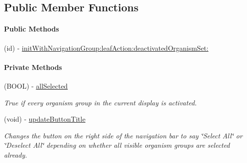 \subsection*{Public Member Functions}
\begin{Indent}\paragraph*{Public Methods}
\begin{DoxyCompactItemize}
\item 
(id) -\/ \hyperlink{interface_p_c_organism_sub_hierarchy_table_view_controller_ad9c5658bfca359751b3ea2752965e2d5}{initWithNavigationGroup:leafAction:deactivatedOrganismSet:}
\end{DoxyCompactItemize}
\end{Indent}
\begin{Indent}\paragraph*{Private Methods}
\begin{DoxyCompactItemize}
\item 
\hypertarget{interface_p_c_organism_sub_hierarchy_table_view_controller_a8128f8748f52e6f9cecc0ffb1b878a64}{
(BOOL) -\/ \hyperlink{interface_p_c_organism_sub_hierarchy_table_view_controller_a8128f8748f52e6f9cecc0ffb1b878a64}{allSelected}}
\label{interface_p_c_organism_sub_hierarchy_table_view_controller_a8128f8748f52e6f9cecc0ffb1b878a64}

\begin{DoxyCompactList}\small\item\em True if every organism group in the current display is activated. \end{DoxyCompactList}\item 
\hypertarget{interface_p_c_organism_sub_hierarchy_table_view_controller_ad49af3da4c716ad3982ffe6c6f4b43ea}{
(void) -\/ \hyperlink{interface_p_c_organism_sub_hierarchy_table_view_controller_ad49af3da4c716ad3982ffe6c6f4b43ea}{updateButtonTitle}}
\label{interface_p_c_organism_sub_hierarchy_table_view_controller_ad49af3da4c716ad3982ffe6c6f4b43ea}

\begin{DoxyCompactList}\small\item\em Changes the button on the right side of the navigation bar to say \char`\"{}Select All\char`\"{} or \char`\"{}Deselect All\char`\"{} depending on whether all visible organism groups are selected already. \end{DoxyCompactList}\end{DoxyCompactItemize}
\end{Indent}
